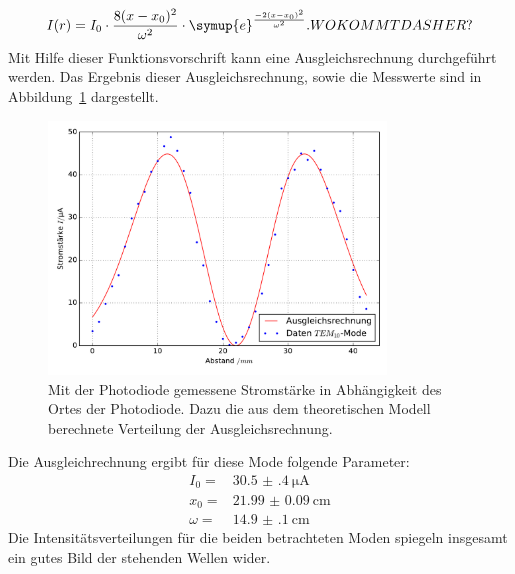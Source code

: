%
\begin{equation}
  I(r)=I_0\cdot\frac{8(x-x_0)^2}{\omega^2}\cdot\symup{e}^{\frac{-2(x-x_0)^2}{\omega^2}}.  WO KOMMT DAS HER?
\end{equation}
%
Mit Hilfe dieser Funktionsvorschrift kann eine Ausgleichsrechnung durchgeführt werden. Das Ergebnis dieser Ausgleichsrechnung, sowie die Messwerte sind in Abbildung~\ref{fig:tem10} dargestellt.
%
\begin{figure}[h]
  \centering
  \includegraphics[width=0.8\textwidth]{auswertung/plot_Mode10.pdf}
  \caption{Mit der Photodiode gemessene Stromstärke in Abhängigkeit des Ortes der Photodiode. Dazu die aus dem theoretischen Modell berechnete Verteilung der Ausgleichsrechnung.}
  \label{fig:tem10}
\end{figure}
%
Die Ausgleichrechnung ergibt für diese Mode folgende Parameter:
%
\begin{align*}
  I_0=&\SI{30.5(4)}{\micro\ampere} \\
  x_0=&\SI{21.99(9)}{\centi\meter} \\
  \omega=&\SI{14.9(1)}{\centi\meter}
\end{align*}
%
Die Intensitätsverteilungen für die beiden betrachteten Moden spiegeln insgesamt ein gutes Bild der stehenden Wellen wider.

%
